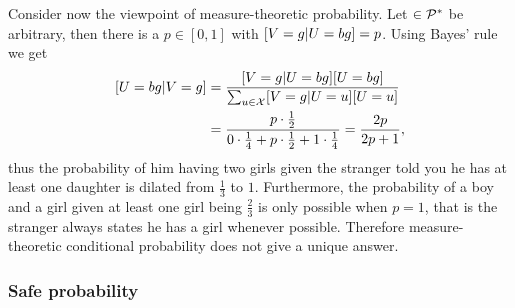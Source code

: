 \documentclass[a4paper]{report}
\theoremstyle{plain}
\theoremstyle{definition}
\theoremstyle{remark}
\numberwithin{equation}{chapter}
\let\P\relax
\DeclareMathOperator{\P}{\mathbb{P}}
\DeclareMathOperator{\1}{\mathbbm{1}}
\newcommand{\X}{\mathcal{X}}
\newcommand{\Pmod}{\mathcal{P}^*}
\begin{document}
Consider now the viewpoint of measure-theoretic probability. Let $\P\in\Pmod$ be arbitrary, then there is a $p\in[0,1]$ with $\P[V=g|U=bg]=p$. Using Bayes' rule we get
\begin{align}
\P[U=bg|V=g]&=\frac{\P[V=g|U=bg]\P[U=bg]}{\sum_{u\in\X}\P[V=g|U=u]\P[U=u]}\\
&=\frac{p\cdot\frac{1}{2}}{0\cdot\frac{1}{4}+p\cdot\frac{1}{2}+1\cdot\frac{1}{4}}=\frac{2p}{2p+1},
\end{align}
thus the probability of him having two girls given the stranger told you he has at least one daughter is dilated from $\frac{1}{3}$ to $1$. Furthermore, the probability of a boy and a girl given at least one girl being $\frac{2}{3}$ is only possible when $p=1$, that is the stranger always states he has a girl whenever possible. Therefore measure-theoretic conditional probability does not give a unique answer.

\subsubsection{Safe probability}
\end{document}
